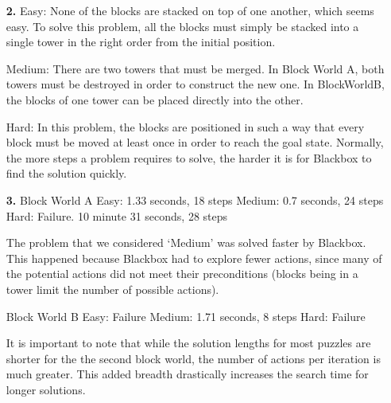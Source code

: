 \documentclass{article}
\begin{document}
\begin{enumerate}
\item[\textbf{2.}]
Easy:
None of the blocks are stacked on top of one another, which seems easy.
To solve this problem, all the blocks must simply be stacked into a
single tower in the right order from the initial position.

Medium:
There are two towers that must be merged.  In Block World A,
both towers must be destroyed in order to construct the new
one.  In BlockWorldB, the blocks of one tower can be placed
directly into the other.

Hard:
In this problem, the blocks are positioned in such a way that every 
block must be moved at least once in order to reach the goal state.
Normally, the more steps a problem requires to solve, the harder it is
for Blackbox to find the solution quickly.

\item[\textbf{3.}]
Block World A
Easy: 1.33 seconds, 18 steps
Medium: 0.7 seconds, 24 steps
Hard: Failure. 10 minute 31 seconds, 28 steps

The problem that we considered ‘Medium’ was solved faster by Blackbox.
This happened because Blackbox had to explore fewer actions, since many
of the potential actions did not meet their preconditions (blocks being
in a tower limit the number of possible actions).

Block World B
Easy: Failure
Medium: 1.71 seconds, 8 steps
Hard: Failure

It is important to note that while the solution lengths for most puzzles
are shorter for the the second block world, the number of actions per
iteration is much greater.  This added breadth drastically increases the
search time for longer solutions.
\end{enumerate}
\end{document}
